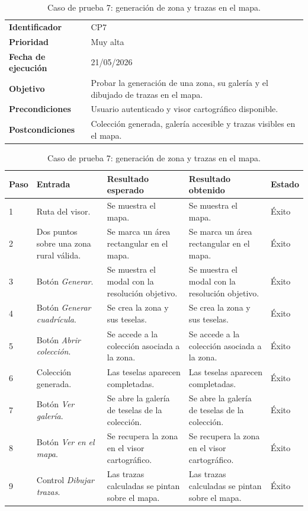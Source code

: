 \begin{table}[]
	\centering
	\footnotesize
	\renewcommand{\arraystretch}{1.2}
	\begin{tabularx}{\textwidth}{p{3.2cm} X}
		\toprule
		\textbf{Identificador} & CP7 \\
		\textbf{Prioridad} & Muy alta \\
		\textbf{Fecha de ejecución} & 21/05/2026 \\
		\textbf{Objetivo} & Probar la generación de una zona, su galería y el dibujado de trazas en el mapa. \\
		\textbf{Precondiciones} & Usuario autenticado y visor cartográfico disponible. \\
		\textbf{Postcondiciones} & Colección generada, galería accesible y trazas visibles en el mapa. \\
		\midrule
	\end{tabularx}
	\begin{tabularx}{\textwidth}{p{0.8cm} p{3.2cm} X X p{1.3cm}}
		\textbf{Paso} & \textbf{Entrada} & \textbf{Resultado esperado} & \textbf{Resultado obtenido} & \textbf{Estado} \\
		\midrule
		1 & Ruta del visor. & Se muestra el mapa. & Se muestra el mapa. & Éxito \\
		2 & Dos puntos sobre una zona rural válida. & Se marca un área rectangular en el mapa. & Se marca un área rectangular en el mapa. & Éxito \\
		3 & Botón \textit{Generar}. & Se muestra el modal con la resolución objetivo. & Se muestra el modal con la resolución objetivo. & Éxito \\
		4 & Botón \textit{Generar cuadrícula}. & Se crea la zona y sus teselas. & Se crea la zona y sus teselas. & Éxito \\
		5 & Botón \textit{Abrir colección}. & Se accede a la colección asociada a la zona. & Se accede a la colección asociada a la zona. & Éxito \\
		6 & Colección generada. & Las teselas aparecen completadas. & Las teselas aparecen completadas. & Éxito \\
		7 & Botón \textit{Ver galería}. & Se abre la galería de teselas de la colección. & Se abre la galería de teselas de la colección. & Éxito \\
		8 & Botón \textit{Ver en el mapa}. & Se recupera la zona en el visor cartográfico. & Se recupera la zona en el visor cartográfico. & Éxito \\
		9 & Control \textit{Dibujar trazas}. & Las trazas calculadas se pintan sobre el mapa. & Las trazas calculadas se pintan sobre el mapa. & Éxito \\
		\bottomrule
	\end{tabularx}
	\caption{Caso de prueba 7: generación de zona y trazas en el mapa.}
	\label{tab:cp7}
\end{table}

